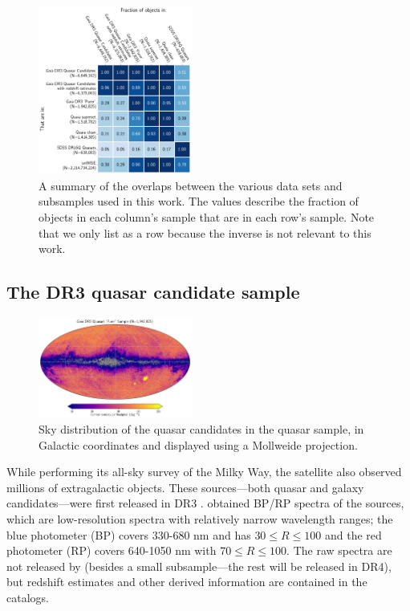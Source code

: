\begin{figure}
    \centering
    \includegraphics[width=0.45\textwidth]{frac_matrix.png}
    \caption{A summary of the overlaps between the various data sets and subsamples used in this work. The values describe the fraction of objects in each column's sample that are in each row's sample. Note that we only list \unWISE as a row because the inverse is not relevant to this work.}
    \label{fig:frac_matrix}
\end{figure}

\subsection{The \Gaia DR3 quasar candidate sample}
\label{sec:data_gaia}

\begin{figure}
    \centering
    \includegraphics[width=0.45\textwidth]{gpurer_2d.png}
    \caption{Sky distribution of the quasar candidates in the \Gaiapurer quasar sample, in Galactic coordinates and displayed using a Mollweide projection.}
    \label{fig:gaia_2d_purer}
\end{figure}

While performing its all-sky survey of the Milky Way, the \Gaia satellite \citep{gaia_collaboration_gaia_2016} also observed millions of extragalactic objects.
These sources---both quasar and galaxy candidates---were first released in \Gaia DR3 \citep{gaia_collaboration_gaia_2023, gaia_collaboration_gaia_2023-1}.
\Gaia obtained BP/RP spectra of the sources, which are low-resolution spectra with relatively narrow wavelength ranges; the blue photometer (BP) covers 330-680 nm and has $30 \leq R \leq 100$ and the red photometer (RP) covers 640-1050 nm \citep{carrasco_internal_2021} with $70 \leq R \leq 100$.
The raw spectra are not released by \Gaia (besides a small subsample---the rest will be released in \Gaia DR4), but redshift estimates and other derived information are contained in the catalogs.


